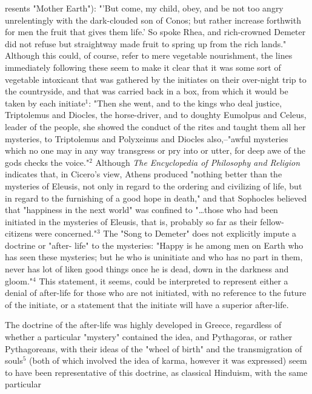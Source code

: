 \noindent resents "Mother Earth"): "'But come, my child, obey, and be not
too angry unrelentingly with the dark-clouded son of Conos;
but rather increase forthwith for men the fruit that gives
them life.' So spoke Rhea, and rich-crowned Demeter did
not refuse but straightway made fruit to spring up from the
rich lands." Although this could, of course, refer to mere
vegetable nourishment, the lines immediately following these
seem to make it clear that it was some sort of vegetable
intoxicant that was gathered by the initiates on their over-night
trip to the countryside, and that was carried back in
a box, from which it would be taken by each initiate$^{1}$:
"Then she went, and to the kings who deal justice, Triptolemus
and Diocles, the horse-driver, and to doughty Eumolpus and
Celeus, leader of the people, she showed the conduct of the
rites and taught them all her mysteries, to Triptolemus and
Polyxeinus and Diocles also,--"awful mysteries which no
one may in any way transgress or pry into or utter, for
deep awe of the gods checks the voice."$^{2}$ Although \textit{The}
\textit{Encyclopedia of Philosophy and Religion} indicates that, in
Cicero's view, Athens produced "nothing better than the
mysteries of Eleusis, not only in regard to the ordering and
civilizing of life, but in regard to the furnishing of a good
hope in death," and that Sophocles believed that "happiness
in the next world" was confined to "\dots those who had been
initiated in the mysteries of Eleusis, that is, probably
so far as their fellow-citizens were concerned."$^{3}$ The "Song
to Demeter" does not explicitly impute a doctrine or "after-
life" to the mysteries: "Happy is he among men on Earth who
has seen these mysteries; but he who is uninitiate and who
has no part in them, never has lot of liken good things once
he is dead, down in the darkness and gloom."$^{4}$ This statement,
it seems, could be interpreted to represent either a denial
of after-life for those who are not initiated, with no
reference to the future of the initiate, or a statement that
the initiate will have a superior after-life.\par
\vspace*{0.5\baselineskip}
The doctrine of the after-life was highly developed in
Greece, regardless of whether a particular "mystery" contained
the idea, and Pythagoras, or rather Pythagoreans, with
their ideas of the "wheel of birth" and the transmigration
of souls$^{5}$ (both of which involved the idea of karma, however
it was expressed) seem to have been representative of this
doctrine, as classical Hinduism, with the same particular
